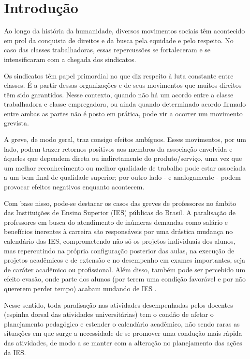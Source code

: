 \textual
{}

\chapter{Introdução}

Ao longo da história da humanidade, diversos movimentos sociais têm acontecido em prol da conquista de direitos e da busca pela equidade e pelo respeito. No caso das classes trabalhadoras, essas repercussões se fortaleceram e se intensificaram com a chegada dos sindicatos.

Os sindicatos têm papel primordial no que diz respeito à luta constante entre classes. É a partir dessas organizações e de seus movimentos que muitos direitos têm sido garantidos. Nesse contexto, quando não há um acordo entre a classe trabalhadora e classe empregadora, ou ainda quando determinado acordo firmado entre ambas as partes não é posto em prática, pode vir a ocorrer um movimento grevista.

A greve, de modo geral, traz consigo efeitos ambíguos. Esses movimentos, por um lado, podem trazer retornos positivos aos membros da associação envolvida e àqueles que dependem direta ou indiretamente do produto/serviço, uma vez que um melhor reconhecimento ou melhor qualidade de trabalho pode estar associada a um bem final de qualidade superior; por outro lado - e analogamente - podem provocar efeitos negativos enquanto acontecem.

Com base nisso, pode-se destacar os casos das greves de professores no âmbito das Instituições de Ensino Superior (IES) públicas do Brasil. A paralisação de professores em busca do atendimento de inúmeras demandas como salário e benefícios inerentes à carreira são responsáveis por uma drástica mudança no calendário das IES, comprometendo não só os projetos individuais dos alunos, mas repercutindo na própria configuração posterior das aulas, na execução de projetos acadêmicos e de extensão e no desempenho em exames importantes, seja de caráter acadêmico ou profissional. Além disso, também pode ser percebido um efeito evasão, onde parte dos alunos (por terem uma condição favorável e por não quererem perder tempo) acabam mudando de IES \cite{Belot2010}.

Nesse sentido, toda paralisação nas atividades desempenhadas pelos docentes (espinha dorsal das atividades universitárias) tem o condão de afetar o planejamento pedagógico e estender o calendário acadêmico, não sendo raras as situações em que surge a necessidade de se promover uma condução mais rápida das atividades, de modo a se manter com a alteração no planejamento das ações da IES.

